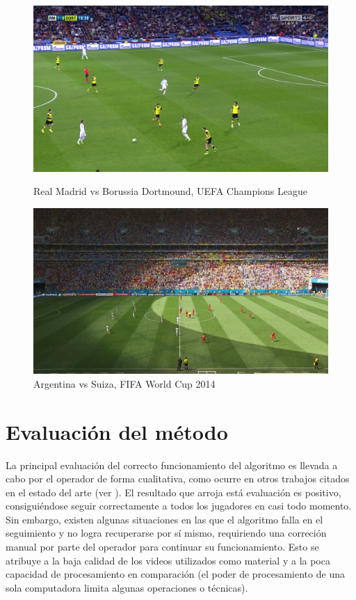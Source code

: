 \begin{figure}[H]
    \centering
    \begin{minipage}[t]{.45\textwidth}
        \centering
        \includegraphics[width=\linewidth]{./images/realmadrid1.png}
        \caption{Real Madrid vs Borussia Dortmound, UEFA Champions League
        \label{fig:realmadrid}}
    \end{minipage}%
    \vspace{0.1cm}
    \begin{minipage}[t]{.45\textwidth}
        \centering
        \includegraphics[width=\linewidth]{./images/argentina1.png}
        \caption{Argentina vs Suiza, FIFA World Cup 2014
        \label{fig:argentina1}}
    \end{minipage}
\end{figure}

\section{Evaluación del método}
\label{sec:evaluacion}

La principal evaluación del correcto funcionamiento del algoritmo es llevada a
cabo por el operador de forma cualitativa, como ocurre en otros trabajos
citados en el estado del arte (ver \cite{papers-tanos}). El resultado que
arroja está evaluación es positivo, consiguiéndose seguir correctamente a
todos los jugadores en casi todo momento. Sin embargo, existen algunas
situaciones en las que el algoritmo falla en el seguimiento y no logra
recuperarse por sí mismo, requiriendo una correción manual por parte del
operador para continuar su funcionamiento. Esto se atribuye a la baja calidad
de los videos utilizados como material y a la poca capacidad de procesamiento
en comparación (el poder de procesamiento de una sola computadora limita
algunas operaciones o técnicas).

